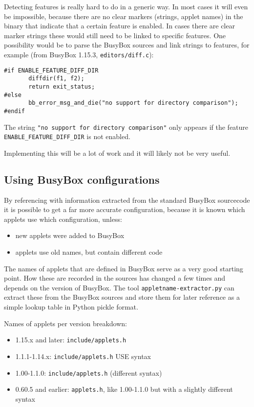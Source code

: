 \documentclass[10pt,a4paper]{article}
\begin{document}
Detecting features is really hard to do in a generic way. In most cases it will
even be impossible, because there are no clear markers (strings, applet names)
in the binary that indicate that a certain feature is enabled. In cases there
are clear marker strings these would still need to be linked to specific
features. One possibility would be to parse the BusyBox sources and link
strings to features, for example (from BusyBox 1.15.3,
\texttt{editors/diff.c}):

\begin{verbatim}
#if ENABLE_FEATURE_DIFF_DIR
       diffdir(f1, f2);
       return exit_status;
#else
       bb_error_msg_and_die("no support for directory comparison");
#endif
\end{verbatim}

The string \texttt{"no support for directory comparison"} only appears if the
feature \texttt{ENABLE\_FEATURE\_DIFF\_DIR} is not enabled.

Implementing this will be a lot of work and it will likely not be very useful.

\subsection{Using BusyBox configurations}

By referencing with information extracted from the standard BusyBox sourcecode
it is possible to get a far more accurate configuration, because it is known
which applets use which configuration, unless:

\begin{itemize}
\item new applets were added to BusyBox
\item applets use old names, but contain different code
\end{itemize}

The names of applets that are defined in BusyBox serve as a very good starting
point. How these are recorded in the sources has changed a few times and
depends on the version of BusyBox. The tool \texttt{appletname-extractor.py}
can extract these from the BusyBox sources and store them for later reference
as a simple lookup table in Python pickle format.

Names of applets per version breakdown:

\begin{itemize}
\item 1.15.x and later: \texttt{include/applets.h}
\item 1.1.1-1.14.x: \texttt{include/applets.h} USE syntax
\item 1.00-1.1.0: \texttt{include/applets.h} (different syntax)
\item 0.60.5 and earlier: \texttt{applets.h}, like 1.00-1.1.0 but with a
slightly different syntax
\end{itemize}
\end{document}
